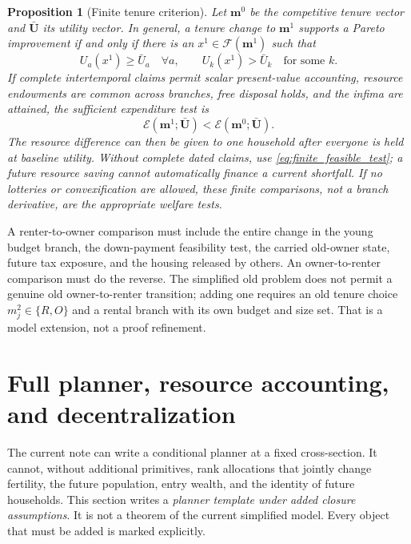 \documentclass[11pt]{article}
\newtheorem{proposition}{Proposition}
\newcommand{\1}{\mathbf 1}
\begin{document}
\begin{proposition}[Finite tenure criterion]
\label{prop:finite_tenure}
Let $\mathbf m^0$ be the competitive tenure vector and
$\bar{\mathbf U}$ its utility vector. In general, a tenure change to
$\mathbf m^1$ supports a Pareto improvement if and only if there is an
$x^1\in\mathcal F(\mathbf m^1)$ such that
\begin{equation}
U_a(x^1)\ge\bar U_a\quad\forall a,
\qquad
U_k(x^1)>\bar U_k\quad\text{for some }k.
\label{eq:finite_feasible_test}
\end{equation}
If complete intertemporal claims permit scalar present-value accounting,
resource endowments are common across branches, free disposal holds, and the
infima are attained, the sufficient expenditure test is
\begin{equation}
\mathcal E(\mathbf m^1;\bar{\mathbf U})
<\mathcal E(\mathbf m^0;\bar{\mathbf U}).
\label{eq:finite_tenure_test}
\end{equation}
The resource difference can then be given to one household after everyone is
held at baseline utility. Without complete dated claims, use
\eqref{eq:finite_feasible_test}; a future resource saving cannot automatically
finance a current shortfall. If no lotteries or convexification are allowed,
these finite comparisons, not a branch derivative, are the appropriate welfare
tests.
\end{proposition}

A renter-to-owner comparison must include the entire change in the young
budget branch, the down-payment feasibility test, the carried old-owner state,
future tax exposure, and the housing released by others. An owner-to-renter
comparison must do the reverse. The simplified old problem does not permit a
genuine old owner-to-renter transition; adding one requires an old tenure
choice $m_j^2\in\{R,O\}$ and a rental branch with its own budget and size set.
That is a model extension, not a proof refinement.

\section{Full planner, resource accounting, and decentralization}
\label{sec:planner}

The current note can write a conditional planner at a fixed cross-section. It
cannot, without additional primitives, rank allocations that jointly change
fertility, the future population, entry wealth, and the identity of future
households. This section writes a \emph{planner template under added closure
assumptions}. It is not a theorem of the current simplified model. Every object
that must be added is marked explicitly.
\end{document}
